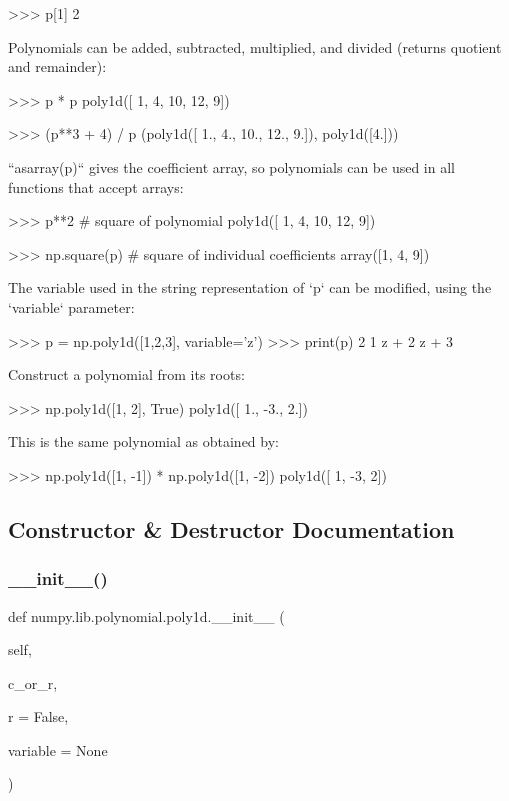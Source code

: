 \begin{DoxyVerb}
>>> p[1]
2

Polynomials can be added, subtracted, multiplied, and divided
(returns quotient and remainder):

>>> p * p
poly1d([ 1,  4, 10, 12,  9])

>>> (p**3 + 4) / p
(poly1d([ 1.,  4., 10., 12.,  9.]), poly1d([4.]))

``asarray(p)`` gives the coefficient array, so polynomials can be
used in all functions that accept arrays:

>>> p**2 # square of polynomial
poly1d([ 1,  4, 10, 12,  9])

>>> np.square(p) # square of individual coefficients
array([1, 4, 9])

The variable used in the string representation of `p` can be modified,
using the `variable` parameter:

>>> p = np.poly1d([1,2,3], variable='z')
>>> print(p)
   2
1 z + 2 z + 3

Construct a polynomial from its roots:

>>> np.poly1d([1, 2], True)
poly1d([ 1., -3.,  2.])

This is the same polynomial as obtained by:

>>> np.poly1d([1, -1]) * np.poly1d([1, -2])
poly1d([ 1, -3,  2])\end{DoxyVerb}
 

\subsection{Constructor \& Destructor Documentation}
\mbox{\label{classnumpy_1_1lib_1_1polynomial_1_1poly1d_a3a1a0cf7f6a8213795b475abf6cb4d5a}} 
\subsubsection{\texorpdfstring{\+\_\+\+\_\+init\+\_\+\+\_\+()}{\_\_init\_\_()}}
{\footnotesize\ttfamily def numpy.\+lib.\+polynomial.\+poly1d.\+\_\+\+\_\+init\+\_\+\+\_\+ (\begin{DoxyParamCaption}\item[{}]{self,  }\item[{}]{c\+\_\+or\+\_\+r,  }\item[{}]{r = {\ttfamily False},  }\item[{}]{variable = {\ttfamily None} }\end{DoxyParamCaption})}



